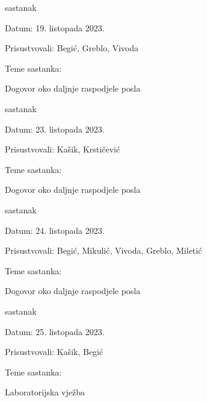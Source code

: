 \begin{packed_enum}
            \item  sastanak
			\item[] \begin{packed_item}
				\item Datum: 19. listopada 2023.
				\item Prisustvovali: Begić, Greblo, Vivoda 
				\item Teme sastanka:
				\begin{packed_item}
					\item  Dogovor oko daljnje raspodjele posla
				\end{packed_item}
			\end{packed_item}

            \item  sastanak
			\item[] \begin{packed_item}
				\item Datum: 23. listopada 2023.
				\item Prisustvovali: Kašik, Krstičević
				\item Teme sastanka:
				\begin{packed_item}
					\item  Dogovor oko daljnje raspodjele posla
				\end{packed_item}
			\end{packed_item}

            \item  sastanak
			\item[] \begin{packed_item}
				\item Datum: 24. listopada 2023.
				\item Prisustvovali: Begić, Mikulić, Vivoda, Greblo, Miletić
				\item Teme sastanka:
				\begin{packed_item}
					\item  Dogovor oko daljnje raspodjele posla
				\end{packed_item}
			\end{packed_item}

            \item  sastanak
			\item[] \begin{packed_item}
				\item Datum: 25. listopada 2023.
				\item Prisustvovali: Kašik, Begić 
				\item Teme sastanka:
				\begin{packed_item}
					\item  Laboratorijska vježba
				\end{packed_item}
			\end{packed_item}


\end{packed_enum}
